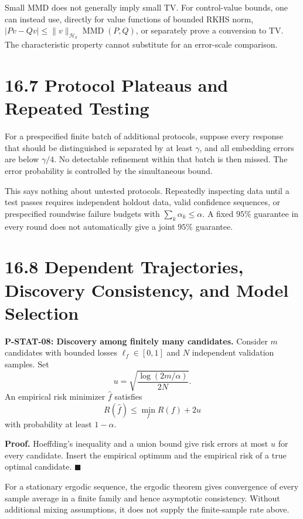 \documentclass[
  english,
  11pt,
  oneside]{book}
\begin{document}
Small MMD does not generally imply small TV. For control-value bounds, one can instead use, directly for value functions of bounded RKHS norm, \(|Pv-Qv|\le\|v\|_{\mathcal H_k}\operatorname{MMD}(P,Q)\), or separately prove a conversion to TV. The characteristic property cannot substitute for an error-scale comparison.

\section{16.7 Protocol Plateaus and Repeated Testing}\label{protocol-plateaus-and-repeated-testing}

For a prespecified finite batch of additional protocols, suppose every response that should be distinguished is separated by at least \(\gamma\), and all embedding errors are below \(\gamma/4\). No detectable refinement within that batch is then missed. The error probability is controlled by the simultaneous bound.

This says nothing about untested protocols. Repeatedly inspecting data until a test passes requires independent holdout data, valid confidence sequences, or prespecified roundwise failure budgets with \(\sum_k\alpha_k\le\alpha\). A fixed \(95\%\) guarantee in every round does not automatically give a joint \(95\%\) guarantee.

\section{16.8 Dependent Trajectories, Discovery Consistency, and Model Selection}\label{dependent-trajectories-discovery-consistency-and-model-selection}

\hypertarget{p-stat-08}{}\label{p-stat-08}

\textbf{P-STAT-08: Discovery among finitely many candidates.} Consider \(m\) candidates with bounded losses \(\ell_f\in[0,1]\) and \(N\) independent validation samples. Set \[u=\sqrt{\frac{\log(2m/\alpha)}{2N}}.\] An empirical risk minimizer \(\widehat f\) satisfies \[R(\widehat f)\le\min_fR(f)+2u\] with probability at least \(1-\alpha\).

\textbf{Proof.} Hoeffding's inequality and a union bound give risk errors at most \(u\) for every candidate. Insert the empirical optimum and the empirical risk of a true optimal candidate. \(\blacksquare\)

For a stationary ergodic sequence, the ergodic theorem gives convergence of every sample average in a finite family and hence asymptotic consistency. Without additional mixing assumptions, it does not supply the finite-sample rate above.
\end{document}
